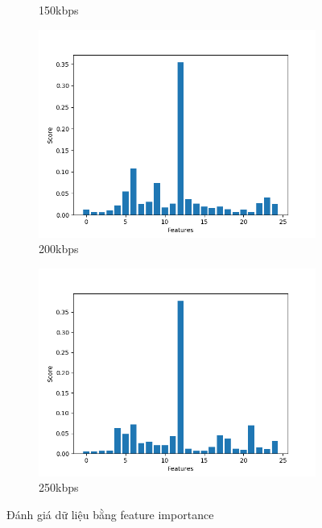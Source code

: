 \begin{figure}
\begin{subfigure}[b]{0.45\textwidth}
         \caption{150kbps}
     \end{subfigure}
     \hfill
     \begin{subfigure}[b]{0.45\textwidth}
         \centering
         \includegraphics[width=\textwidth]{Image/feature_importance_200k}
         \caption{200kbps}
     \end{subfigure}
          \hfill
     \begin{subfigure}[b]{0.45\textwidth}
         \centering
         \includegraphics[width=\textwidth]{Image/feature_importance_250k}
         \caption{250kbps}
     \end{subfigure}
        \caption{Đánh giá dữ liệu bằng feature importance}
        \label{fig:feature_importance}
\end{figure}
